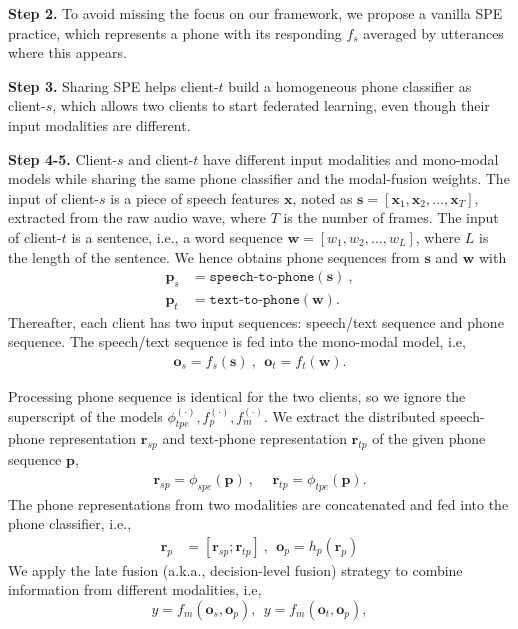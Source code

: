 \documentclass[11pt]{article}
\begin{document}
\textbf{Step 2.} To avoid missing the focus on our framework, we propose a vanilla SPE practice, which represents a phone with its responding $f_s$ averaged by utterances where this  appears.

\textbf{Step 3.} Sharing SPE helps client-$t$ build a homogeneous phone classifier as client-$s$, which allows two clients to start federated learning, even though their input modalities are different.


\textbf{Step 4-5.} Client-$s$ and client-$t$ have different input modalities and mono-modal models while sharing the same phone classifier and the modal-fusion weights. The input of client-$s$ is a piece of speech features $\mathbf{x}$, noted as $\mathbf{s}=\left[\mathbf{x}_1,\mathbf{x}_2,...,\mathbf{x}_T\right]$, extracted from the raw audio wave, where $T$ is the number of frames.  The input of client-$t$ is a sentence, i.e., a word sequence $\mathbf{w}=\left[w_1,w_2,...,w_L\right]$, where $L$ is the length of the sentence. We hence obtains phone sequences from $\mathbf{s}$ and $\mathbf{w}$ with
\begin{equation}
\begin{aligned}
  \mathbf{p}_s &= \texttt{speech-to-phone}(\mathbf{s})~,\\
  \mathbf{p}_t &=\texttt{text-to-phone}(\mathbf{w}).
\end{aligned}
\label{eq:1}
\end{equation}
Thereafter, each client has two input sequences: speech/text sequence and phone sequence. The speech/text sequence is fed into the mono-modal model, i.e,
\begin{equation}
\begin{aligned}
    \mathbf{o}_s = {f}_s(\mathbf{s})~,~~\mathbf{o}_t = {f}_t(\mathbf{w}).
\end{aligned}
\label{eq:2}
\end{equation}

Processing phone sequence is identical for the two clients, so we ignore the superscript of the models ${\phi}_{tpe}^{(\cdot)}, {f}_{p}^{(\cdot)}, {f}_m^{(\cdot)}$. We extract the distributed speech-phone representation $\mathbf{r}_{sp}$ and text-phone representation $\mathbf{r}_{tp}$ of the given phone sequence $\mathbf{p}$,
\begin{align}
    \mathbf{r}_{sp}  = \phi_{spe}(\mathbf{p})~,&~~\mathbf{r}_{tp} = \phi_{tpe}(\mathbf{p}).
\end{align}
The phone representations from two modalities are concatenated and fed into the phone classifier, i.e.,
\begin{align}
    \mathbf{r}_{p} &= [\mathbf{r}_{sp};\mathbf{r}_{tp}]~,~~\mathbf{o}_p = h_p(\mathbf{r}_{p})
\end{align}
We apply the late fusion (a.k.a., decision-level fusion) strategy \cite{Xueyang-zadeh2017tensor} to combine information from different modalities, i.e,
\begin{equation}
    y = {f}_{m}(\mathbf{o}_{s}, \mathbf{o}_p),~~y = {f}_{m}(\mathbf{o}_{t}, \mathbf{o}_p), \label{eq:7}
\end{equation}
\end{document}
